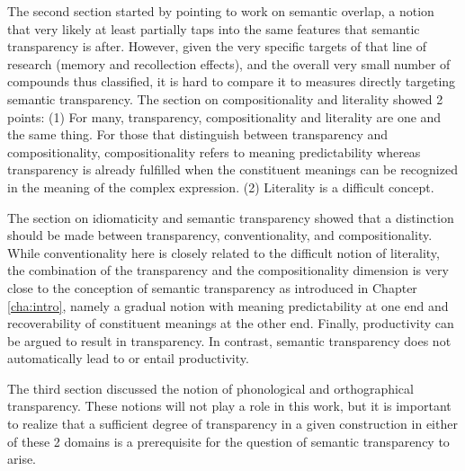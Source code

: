 \enlargethispage{1\baselineskip}
The second section started by pointing to work on semantic overlap,
a notion that very likely at least partially taps into the same
features that semantic transparency is after. However, given the very
specific targets of that line of research (memory and recollection
effects), and the overall very small number of compounds thus
classified, it is hard to compare it to measures directly targeting
semantic transparency. The section on compositionality and literality
showed 2 points: (1) For many, transparency, compositionality and
literality are one and the same thing. For those that distinguish
between transparency and compositionality, compositionality refers to
meaning predictability whereas transparency is already fulfilled when
the constituent meanings can be recognized in the meaning of the
complex expression. (2) Literality is a difficult concept. 

The section
on idiomaticity and semantic transparency showed that a distinction should be made
between transparency, conventionality, and compositionality. While
conventionality here is closely related to the difficult notion of
literality, the combination of the transparency and the
compositionality dimension is very close to the conception of semantic
transparency as introduced in Chapter \ref{cha:intro}, namely a
gradual notion with meaning predictability at one end and
recoverability of constituent meanings at the other end. Finally,
productivity can be argued to result in transparency. In contrast,
semantic transparency does not automatically lead to or entail productivity.

The third section discussed the notion of phonological and
orthographical trans\-par\-en\-cy. These notions will not play a role in
this work, but it is important to realize that a sufficient degree of
transparency in a given construction in either of these 2 domains is a prerequisite for the
question of semantic transparency to arise. 



